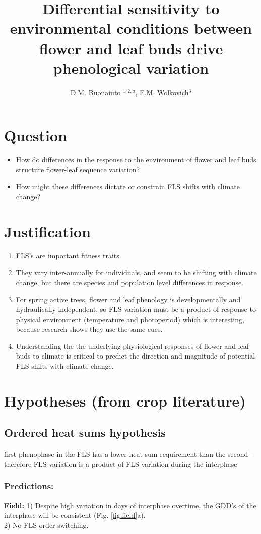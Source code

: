 \documentclass[11pt]{article}
\title{Differential sensitivity to environmental conditions between flower and leaf buds drive phenological variation}
\date{}
\author{D.M. Buonaiuto $^{1,2,a}$, E.M. Wolkovich$^{3}$}
\begin{document}
\section{Question}
\begin{itemize}
\item How do differences in the response to the environment of flower and leaf buds structure flower-leaf sequence variation? 
\item How might these differences dictate or constrain FLS shifts with climate change?
\end{itemize}

\section{Justification}
\begin{enumerate}
\item FLS's are important fitness traits
\item They vary inter-annually for individuals, and seem to be shifting with climate change, but there are species and population level differences in response.
\item For spring active trees, flower and leaf phenology is developmentally and hydraulically independent, so FLS variation must be a product of response to physical environment (temperature and photoperiod) which is interesting, because research shows they use the same cues.
\item Understanding the the underlying physiological responses of flower and leaf buds to climate is critical to predict the direction and magnitude of potential FLS shifts with climate change.
\end{enumerate}

\section{Hypotheses (from crop literature)}
\subsection{Ordered heat sums hypothesis}
\noindentThe first phenophase in the FLS has a lower heat sum requirement than the second-- therefore FLS variation is a product of FLS variation during the interphase
\subsubsection{Predictions:}
\noindent \textbf{Field:} 1) Despite high variation in days of interphase overtime, the GDD's of the interphase will be consistent (Fig. \ref{fig:field}a).\\ 2) No FLS order switching.\\
\end{document}
